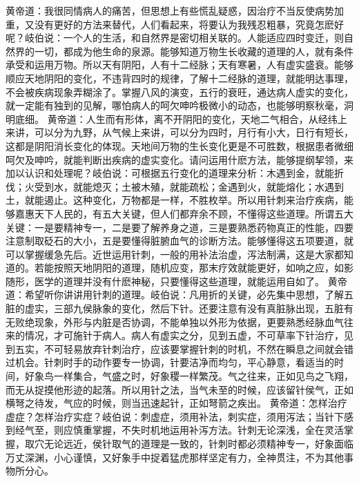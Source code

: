 \documentclass[a4paper,12pt,UTF8,twoside]{ctexbook}
\begin{document}
黄帝道：我很同情病人的痛苦，但思想上有些慌乱疑惑，因治疗不当反使病势加重，又没有更好的方法来替代，人们看起来，将要认为我残忍粗暴，究竟怎麽好呢？岐伯说：一个人的生活，和自然界是密切相关联的。人能适应四时变迁，则自然界的一切，都成为他生命的泉源。能够知道万物生长收藏的道理的人，就有条件承受和运用万物。所以天有阴阳，人有十二经脉；天有寒暑，人有虚实盛衰。能够顺应天地阴阳的变化，不违背四时的规律，了解十二经脉的道理，就能明达事理，不会被疾病现象弄糊涂了。掌握八风的演变，五行的衰旺，通达病人虚实的变化，就一定能有独到的见解，哪怕病人的呵欠呻吟极微小的动态，也能够明察秋毫，洞明底细。
黄帝道：人生而有形体，离不开阴阳的变化，天地二气相合，从经纬上来讲，可以分为九野，从气候上来讲，可以分为四时，月行有小大，日行有短长，这都是阴阳消长变化的体现。天地间万物的生长变化更是不可胜数，根据患者微细呵欠及呻吟，就能判断出疾病的虚实变化。请问运用什麽方法，能够提纲挈领，来加以认识和处理呢？岐伯说：可根据五行变化的道理来分析：木遇到金，就能折伐；火受到水，就能熄灭；土被木殖，就能疏松；金遇到火，就能熔化；水遇到土，就能遏止。这种变化，万物都是一样，不胜枚举。所以用针刺来治疗疾病，能够嘉惠天下人民的，有五大关键，但人们都弃余不顾，不懂得这些道理。所谓五大关键：一是要精神专一，二是要了解养身之道，三是要熟悉药物真正的性能，四要注意制取砭石的大小，五是要懂得脏腑血气的诊断方法。能够懂得这五项要道，就可以掌握缓急先后。近世运用针刺，一般的用补法治虚，泻法制满，这是大家都知道的。若能按照天地阴阳的道理，随机应变，那末疗效就能更好，如响之应，如影随形，医学的道理并没有什麽神秘，只要懂得这些道理，就能运用自如了。
黄帝道：希望听你讲讲用针刺的道理。岐伯说：凡用折的关键，必先集中思想，了解五脏的虚实，三部九侯脉象的变化，然后下针。还要注意有没有真脏脉出现，五脏有无败绝现象，外形与内脏是否协调，不能单独以外形为依据，更要熟悉经脉血气往来的情况，才可施针于病人。病人有虚实之分，见到五虚，不可草率下针治疗，见到五实，不可轻易放弃针刺治疗，应该要掌握针刺的时机，不然在瞬息之间就会错过机会。针刺时手的动作要专一协调，针要洁净而均匀，平心静意，看适当的时间，好象鸟一样集合，气盛之时，好象稷一样繁茂。气之往来，正如见鸟之飞翔，而无从捉摸他形迹的起落。所以用针之法，当气未至的时候，应该留针侯气，正如横弩之待发，气应的时候，则当迅速起针，正如弩箭之疾出。
黄帝道：怎样治疗虚症？怎样治疗实症？岐伯说：刺虚症，须用补法，刺实症，须用泻法；当针下感到经气至，则应慎重掌握，不失时机地运用补泻方法。针刺无论深浅，全在灵活掌握，取穴无论远近，侯针取气的道理是一致的，针刺时都必须精神专一，好象面临万丈深渊，小心谨慎，又好象手中捉着猛虎那样坚定有力，全神贯注，不为其他事物所分心。
\end{document}
